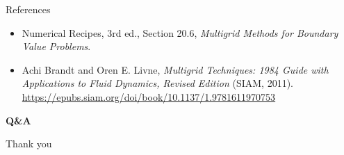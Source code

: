 \documentclass[aspectratio=169]{beamer}
\newcommand{\frametitlesub}[2]{#2}
\begin{document}
\begin{frame}[t]{\frametitlesub{Conclusions}{References}}
    \footnotesize
    \begin{itemize}
        \item Numerical Recipes, 3rd ed., Section 20.6, \emph{Multigrid Methods for Boundary Value Problems}.
        \item Achi Brandt and Oren E. Livne, \emph{Multigrid Techniques: 1984 Guide with Applications to Fluid Dynamics, Revised Edition} (SIAM, 2011). \url{https://epubs.siam.org/doi/book/10.1137/1.9781611970753}
    \end{itemize}
\end{frame}

\begin{frame}[plain]
    \vfill
    \centering
    {\Huge \textbf{Q\&A}\par}
    \vspace{1em}
    {\large Thank you\par}
    \vfill
\end{frame}
\end{document}
